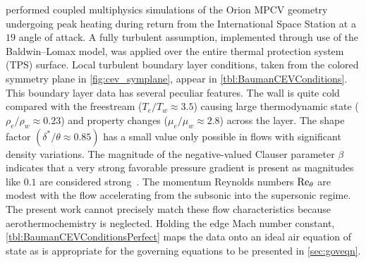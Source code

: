 \citet{Bauman2011Loose} performed coupled multiphysics simulations of
the Orion MPCV geometry undergoing peak heating during return from
the International Space Station at a $19$\textdegree{} angle of attack.
%
A fully turbulent assumption, implemented through use of the Baldwin--Lomax
model, was applied over the entire thermal protection system (TPS) surface.
%
Local turbulent
boundary layer conditions, taken from the colored symmetry plane in
\autoref{fig:cev_symplane}, appear in \autoref{tbl:BaumanCEVConditions}.
This boundary layer data has several peculiar features.  The wall
is quite cold compared with the freestream ($T_e/T_w \approx
3.5$) causing large thermodynamic state ($\rho_e/\rho_w \approx
0.23$) and property changes ($\mu_e/\mu_w \approx 2.8$) across
the layer.  The shape factor $(\delta^\ast / \theta \approx 0.85)$
has a small value only possible in flows with significant density
variations.  The magnitude of the negative-valued Clauser parameter
$\beta$~\citep{Clauser1954Turbulent} indicates that a very strong favorable
pressure gradient is present as magnitudes like $0.1$ are considered
strong~\citep{Smith1994Effects,Luker2000Influence}.  The momentum
Reynolds numbers $\Reynolds[\theta]$ are modest with the flow
accelerating from the subsonic into the supersonic regime.
The present work cannot precisely match
these flow characteristics because aerothermochemistry is neglected.
Holding the edge Mach number constant,
\autoref{tbl:BaumanCEVConditionsPerfect} maps the data onto an ideal
air equation of state as is appropriate for the governing equations
to be presented in \autoref{sec:goveqn}.




